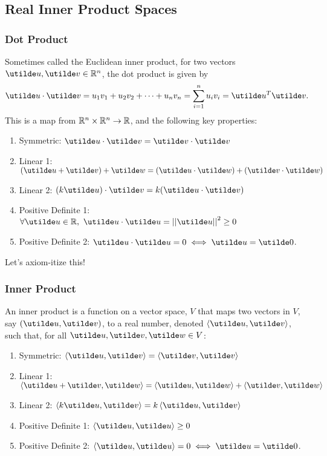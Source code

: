 \documentclass{report}
\begin{document}
\subsection{Real Inner Product Spaces}
\subsubsection{Dot Product}
Sometimes called the Euclidean inner product, for two vectors $\ut{u},\ut{v}\in\bbr^n$, the dot product is given by
$$
  \ut{u}\cd\ut{v} = u_1v_1 + u_2v_2 + \dots + u_nv_n = \sum_{i=1}^{n} u_iv_i = \ut{u}^T\ut{v}.
$$
This is a map from $\mathbb{R}^n\times\mathbb{R}^n\to\mathbb{R}$, and the following key properties:
\begin{enumerate}[label=(\roman*)]
  \item Symmetric: $\ut{u}\cd\ut{v} = \ut{v}\cd\ut{v}$
  \item Linear 1: $\bracks{\ut{u}+\ut{v}} + \ut{w} = (\ut{u}\cd\ut{w}) + (\ut{v}\cd\ut{w})$
  \item Linear 2: $(k\ut{u})\cd\ut{v} = k(\ut{u}\cd\ut{v})$
  \item Positive Definite 1: $\forall\ut{u}\in\bbr,\ \ut{u}\cd\ut{u} = \abs{\abs{\ut{u}}}^2 \geq 0$
  \item Positive Definite 2: $\ut{u}\cd\ut{u} = 0 \iff \ut{u} = \ut{0}$.
\end{enumerate}
Let's axiom-itize this!

\subsubsection{Inner Product}
An inner product is a function on a vector space, $V$ that maps two vectors in $V$, say $(\ut{u},\ut{v})$, to a real number, denoted $\brangle{\ut{u},\ut{v}}$, such that, for all $\ut{u},\ut{v},\ut{w}\in V$:
\begin{enumerate}[label=(\textbf{I\arabic*})]
  \item Symmetric: $\brangle{\ut{u},\ut{v}} = \brangle{\ut{v},\ut{v}}$
  \item Linear 1: $\brangle{\ut{u}+\ut{v}, \ut{w}} = \brangle{\ut{u},\ut{w}} + \brangle{\ut{v},\ut{w}}$
  \item Linear 2: $\brangle{k\ut{u},\ut{v}} = k\brangle{\ut{u},\ut{v}}$
  \item Positive Definite 1: $\brangle{\ut{u},\ut{u}} \geq 0$
  \item Positive Definite 2: $\brangle{\ut{u},\ut{u}} = 0 \iff \ut{u} = \ut{0}$.
\end{enumerate}
\end{document}

